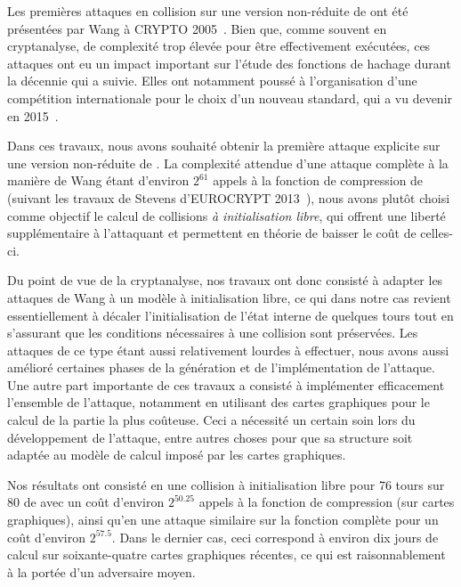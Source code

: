 \medskip

Les premières attaques en collision sur une version non-réduite de \shaone ont été présentées par Wang \etal à CRYPTO 2005~\cite{DBLP:conf/crypto/WangYY05a}. Bien que,
comme souvent en cryptanalyse, de complexité
trop élevée pour être effectivement exécutées, ces attaques ont eu un impact important sur l'étude des fonctions de hachage durant la décennie qui a suivie. Elles ont notamment poussé à l'organisation
d'une compétition internationale pour le choix d'un nouveau standard, qui a vu \keccak devenir \shathree en 2015~\cite{Nist-SHA3}.

Dans ces travaux, nous avons souhaité obtenir la première attaque explicite sur une version non-réduite de \shaone. La complexité attendue d'une attaque complète à la
manière de Wang étant d'environ $2^{61}$ appels
à la fonction de compression de \shaone (suivant les travaux de Stevens d'EUROCRYPT 2013~\cite{DBLP:conf/eurocrypt/Stevens13}), nous avons plutôt choisi comme objectif le calcul de collisions
\emph{à initialisation libre}, qui offrent une liberté supplémentaire à l'attaquant et permettent en théorie de baisser le coût de celles-ci.

Du point de vue de la cryptanalyse, nos travaux ont
donc consisté à adapter les attaques de Wang \etal à un modèle à initialisation libre, ce qui dans notre cas revient essentiellement à décaler l'initialisation de l'état interne \shaone de quelques
tours tout en s'assurant que les conditions nécessaires à une collision sont préservées. Les attaques de ce type étant aussi relativement lourdes à effectuer, nous avons aussi amélioré certaines
phases de la génération et de l'implémentation de l'attaque.
Une autre part importante de ces travaux a consisté à implémenter efficacement l'ensemble de l'attaque, notamment en utilisant des cartes graphiques pour le calcul de la partie la plus coûteuse.
Ceci a nécessité un certain soin lors du développement de l'attaque, entre autres choses pour que sa structure soit adaptée au modèle de calcul imposé par les cartes graphiques.

Nos résultats ont consisté en une collision à initialisation libre pour 76 tours sur 80 de \shaone avec un coût d'environ $2^{50.25}$ appels à la fonction de compression (sur cartes graphiques),
ainsi qu'en une attaque similaire sur la fonction complète pour un coût d'environ $2^{57.5}$. Dans le dernier cas, ceci correspond à environ dix jours de calcul sur soixante-quatre cartes
graphiques récentes, ce qui est raisonnablement à la portée d'un adversaire moyen.


